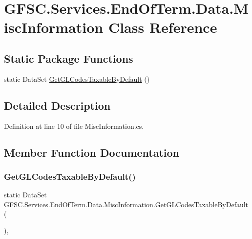 \hypertarget{class_g_f_s_c_1_1_services_1_1_end_of_term_1_1_data_1_1_misc_information}{}\section{G\+F\+S\+C.\+Services.\+End\+Of\+Term.\+Data.\+Misc\+Information Class Reference}
\label{class_g_f_s_c_1_1_services_1_1_end_of_term_1_1_data_1_1_misc_information}
\subsection*{Static Package Functions}
\begin{DoxyCompactItemize}
\item 
static Data\+Set \mbox{\hyperlink{class_g_f_s_c_1_1_services_1_1_end_of_term_1_1_data_1_1_misc_information_a3c00e3cf9620f5450aefadd2c7af1f04}{Get\+G\+L\+Codes\+Taxable\+By\+Default}} ()
\end{DoxyCompactItemize}


\subsection{Detailed Description}


Definition at line 10 of file Misc\+Information.\+cs.



\subsection{Member Function Documentation}
\mbox{\label{class_g_f_s_c_1_1_services_1_1_end_of_term_1_1_data_1_1_misc_information_a3c00e3cf9620f5450aefadd2c7af1f04}} 
\subsubsection{\texorpdfstring{Get\+G\+L\+Codes\+Taxable\+By\+Default()}{GetGLCodesTaxableByDefault()}}
{\footnotesize\ttfamily static Data\+Set G\+F\+S\+C.\+Services.\+End\+Of\+Term.\+Data.\+Misc\+Information.\+Get\+G\+L\+Codes\+Taxable\+By\+Default (\begin{DoxyParamCaption}{ }\end{DoxyParamCaption})\hspace{0.3cm}{\ttfamily [static]}, {\ttfamily [package]}}



